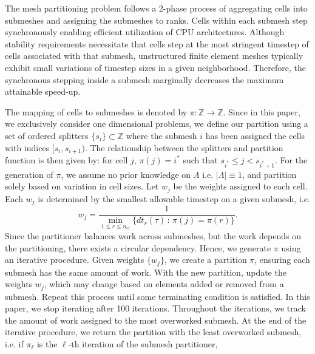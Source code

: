 The mesh partitioning problem follows a 2-phase process of aggregating cells into submeshes and assigning the submeshes to ranks. Cells within each submesh step synchronously enabling efficient utilization of CPU architectures. Although stability requirements necessitate that cells step at the most stringent timestep of cells associated with that submesh, unstructured finite element meshes typically exhibit small variations of timestep sizes in a given neighborhood. Therefore, the synchronous stepping inside a submesh marginally decreases the maximum attainable speed-up.

The mapping of cells to submeshes is denoted by $\pi:\mathbb{Z} \to \mathbb{Z}$.
Since in this paper, we exclusively consider one dimensional problems, we define our partition using a set of ordered splitters $\{s_i\}\subset \mathbb{Z}$ where the submesh $i$ has been assigned the cells with indices $[s_i,s_{i+1})$. The relationship between the splitters and partition function is then given by: for cell $j$, $\pi(j) = i^*$ such that $s_{i^*} \le j < s_{i^*+1}$. %
For the generation of $\pi$, we assume no prior knowledge on $\Lambda$ i.e. $|\Lambda| \equiv 1$, and partition solely based on variation in cell sizes. 
Let $w_j$ be the weights assigned to each cell. Each $w_j$ is determined by the smallest allowable timestep on a given submesh, i.e.
\begin{equation*}
w_j = \frac{1}{\min_{1\le r \le n_{el}}\{dt_r(\tau) \, : \, \pi(j) = \pi(r) \}}.
\end{equation*}
Since the partitioner balances work across submeshes, but the work depends on the partitioning, there exists a circular dependency.
Hence, we generate $\pi$ using an iterative procedure. Given weights $\{w_j\}$, we create a partition $\pi$, ensuring each submesh has the same amount of work.
 With the new partition, update the weights $w_j$, which may change based on elements added or removed from a submesh. Repeat this process until some terminating condition is satisfied. In this paper, we stop iterating after 100 iterations. Throughout the iterations, we track the amount of work assigned to the most overworked submesh. At the end of the iterative procedure, we return the partition with the least overworked submesh, i.e. if $\pi_{\ell}$ is the $\ell$-th iteration of the submesh partitioner, 
